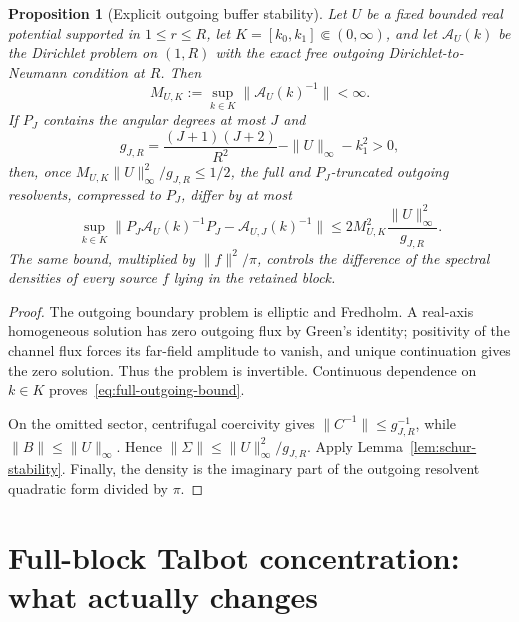\documentclass[11pt]{article}
\newtheorem{proposition}[theorem]{Proposition}
\theoremstyle{remark}
\begin{document}
\begin{proposition}[Explicit outgoing buffer stability]
\label{prop:explicit-buffer-stability}
Let $U$ be a fixed bounded real potential supported in $1\leq r\leq R$,
let $K=[k_0,k_1]\Subset(0,\infty)$, and let $\mathcal A_U(k)$ be the
Dirichlet problem on $(1,R)$ with the exact free outgoing
Dirichlet-to-Neumann condition at $R$.  Then
\begin{equation}
 M_{U,K}:=\sup_{k\in K}\|\mathcal A_U(k)^{-1}\|<\infty.
 \label{eq:full-outgoing-bound}
\end{equation}
If $P_J$ contains the angular degrees at most $J$ and
\[
 g_{J,R}=\frac{(J+1)(J+2)}{R^2}-\|U\|_\infty-k_1^2>0,
\]
then, once $M_{U,K}\|U\|_\infty^2/g_{J,R}\leq1/2$, the full and
$P_J$-truncated outgoing resolvents, compressed to $P_J$, differ by at most
\begin{equation}
 \sup_{k\in K}
 \|P_J\mathcal A_U(k)^{-1}P_J-\mathcal A_{U,J}(k)^{-1}\|
 \leq
 2M_{U,K}^2\frac{\|U\|_\infty^2}{g_{J,R}}.
 \label{eq:explicit-buffer-resolvent}
\end{equation}
The same bound, multiplied by $\|f\|^2/\pi$, controls the difference of the
spectral densities of every source $f$ lying in the retained block.
\end{proposition}

\begin{proof}
The outgoing boundary problem is elliptic and Fredholm.  A real-axis
homogeneous solution has zero outgoing flux by Green's identity; positivity
of the channel flux forces its far-field amplitude to vanish, and unique
continuation gives the zero solution.  Thus the problem is invertible.
Continuous dependence on $k\in K$ proves~\eqref{eq:full-outgoing-bound}.

On the omitted sector, centrifugal coercivity gives
$\|C^{-1}\|\leq g_{J,R}^{-1}$, while $\|B\|\leq\|U\|_\infty$.  Hence
$\|\Sigma\|\leq\|U\|_\infty^2/g_{J,R}$.  Apply
Lemma~\ref{lem:schur-stability}.  Finally, the density is the imaginary part
of the outgoing resolvent quadratic form divided by $\pi$.
\end{proof}

\section{Full-block Talbot concentration: what actually changes}
\end{document}

